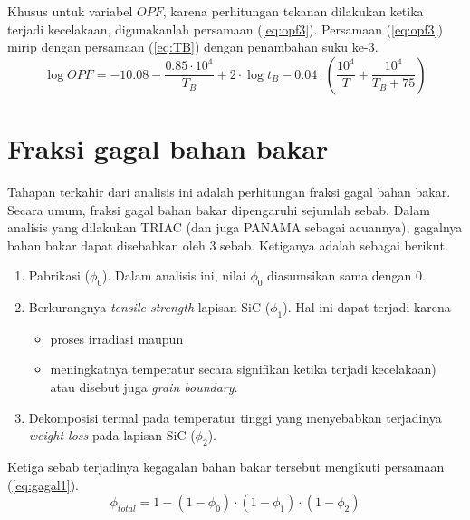 \documentclass[a4paper,11pt]{report}
\begin{document}
Khusus untuk variabel $OPF$, karena perhitungan tekanan dilakukan ketika terjadi kecelakaan, digunakanlah persamaan (\ref{eq:opf3}). Persamaan (\ref{eq:opf3}) mirip dengan persamaan (\ref{eq:TB}) dengan penambahan suku ke-3.
\begin{equation}
  \log OPF=-10.08-\frac{0.85 \cdot 10^4}{T_B} + 2 \cdot \log t_B - 0.04 \cdot \left( \frac{10^4}{T} + \frac{10^4}{T_B + 75} \right)
  \label{eq:opf3}
\end{equation}

\section{Fraksi gagal bahan bakar}
Tahapan terkahir dari analisis ini adalah perhitungan fraksi gagal bahan bakar. Secara umum, fraksi gagal bahan bakar dipengaruhi sejumlah sebab. Dalam analisis yang dilakukan TRIAC (dan juga PANAMA sebagai acuannya), gagalnya bahan bakar dapat disebabkan oleh 3 sebab. Ketiganya adalah sebagai berikut.
\begin{enumerate}
\item Pabrikasi ($\phi_0$). Dalam analisis ini, nilai $\phi_0$ diasumsikan sama dengan $0$.
\item Berkurangnya \textit{tensile strength} lapisan SiC ($\phi_1$). Hal ini dapat terjadi karena
\begin{itemize}
\item proses irradiasi maupun
\item meningkatnya temperatur secara signifikan ketika terjadi kecelakaan) atau disebut juga \textit{grain boundary}.
\end{itemize}  
\item Dekomposisi termal pada temperatur tinggi yang menyebabkan terjadinya \textit{weight loss} pada lapisan SiC ($\phi_2$).
\end{enumerate}

Ketiga sebab terjadinya kegagalan bahan bakar tersebut mengikuti persamaan (\ref{eq:gagal1}).
\begin{equation}
  \phi_{total}=1-(1-\phi_0) \cdot(1-\phi_1) \cdot (1-\phi_2)
  \label{eq:gagal1}
\end{equation}
\end{document}
